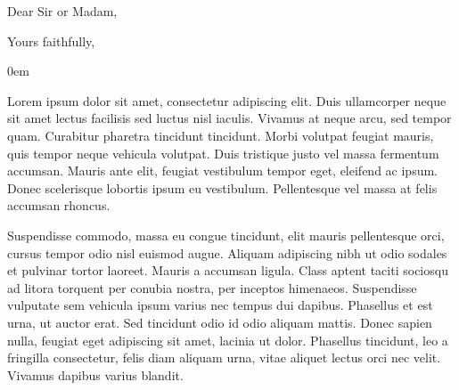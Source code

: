 \documentclass[11pt,a4paper,sans]{moderncv}        %
\makeatletter
\def\flushboth{%
      \let\\\@normalcr
        \@rightskip\z@skip \rightskip\@rightskip
          \leftskip\z@skip
           \parindent 0em\relax}%
\makeatother
\begin{document}
\nocite{*}



\clearpage
\date{\today}%
\opening{Dear Sir or Madam,}
\closing{Yours faithfully,}
\makelettertitle

\flushboth %

Lorem ipsum dolor sit amet, consectetur adipiscing elit. Duis ullamcorper neque sit amet lectus facilisis sed luctus nisl iaculis. Vivamus at neque arcu, sed tempor quam. Curabitur pharetra tincidunt tincidunt. Morbi volutpat feugiat mauris, quis tempor neque vehicula volutpat. Duis tristique justo vel massa fermentum accumsan. Mauris ante elit, feugiat vestibulum tempor eget, eleifend ac ipsum. Donec scelerisque lobortis ipsum eu vestibulum. Pellentesque vel massa at felis accumsan rhoncus.

Suspendisse commodo, massa eu congue tincidunt, elit mauris pellentesque orci, cursus tempor odio nisl euismod augue. Aliquam adipiscing nibh ut odio sodales et pulvinar tortor laoreet. Mauris a accumsan ligula. Class aptent taciti sociosqu ad litora torquent per conubia nostra, per inceptos himenaeos. Suspendisse vulputate sem vehicula ipsum varius nec tempus dui dapibus. Phasellus et est urna, ut auctor erat. Sed tincidunt odio id odio aliquam mattis. Donec sapien nulla, feugiat eget adipiscing sit amet, lacinia ut dolor. Phasellus tincidunt, leo a fringilla consectetur, felis diam aliquam urna, vitae aliquet lectus orci nec velit. Vivamus dapibus varius blandit.
\end{document}
